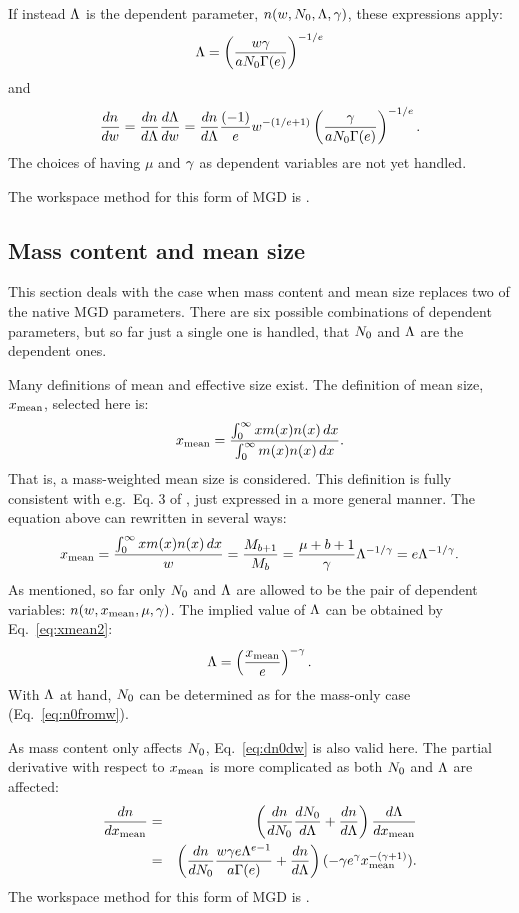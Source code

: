 If instead $\Lambda$ is the dependent parameter, $n(w,N_0,\Lambda,\gamma)$, these expressions apply:
\begin{equation}
  \Lambda = \left( \frac{w\gamma}{aN_0\Gamma(e)} \right)^{-1/e}
\end{equation}
and
\begin{equation}
  \frac{dn}{dw} = \frac{dn}{d\Lambda}\frac{d\Lambda}{dw} = \frac{dn}{d\Lambda} 
  \frac{(-1)}{e}w^{-(1/e+1)}\left( \frac{\gamma}{aN_0\Gamma(e)} \right)^{-1/e}.
\end{equation}
The choices of having $\mu$ and $\gamma$ as dependent variables are not yet
handled. 

The workspace method for this form of MGD is .



\subsection{Mass content and mean size}
%
This section deals with the case when mass content and mean size replaces two
of the native MGD parameters. There are six possible combinations of 
dependent parameters, but so far just a single one is handled, that $N_0$ and
$\Lambda$ are the dependent ones. 

Many definitions of mean and effective size exist. The definition of mean size,
$x_\mathrm{mean}$, selected here is:
\begin{equation}
  x_\mathrm{mean} =\frac{\int_0^\infty x m(x) n(x)\,dx}{\int_0^\infty m(x) n(x)\,dx}.
\end{equation}
That is, a mass-weighted mean size is considered. This definition is fully
consistent with e.g.\ Eq. 3 of \citet{delanoe2014normalized}, just expressed
in a more general manner. The equation above can rewritten in several ways:
\begin{equation}
  x_\mathrm{mean} =\frac{\int_0^\infty x m(x) n(x)\,dx}{w}=\frac{M_{b+1}}{M_b}=
  \frac{\mu+b+1}{\gamma}\Lambda^{-1/\gamma}=e\Lambda^{-1/\gamma}.
  \label{eq:xmean2}
\end{equation}
As mentioned, so far only $N_0$ and $\Lambda$ are allowed to be the pair of
dependent variables: $n(w,x_\mathrm{mean},\mu,\gamma)$. The implied value of $\Lambda$ can be
obtained by Eq.~\ref{eq:xmean2}:
\begin{equation}
  \Lambda = \left( \frac{x_\mathrm{mean}}{e}\right)^{-\gamma}.
\end{equation}
With $\Lambda$ at hand, $N_0$ can be determined as for the mass-only case
(Eq.~\ref{eq:n0fromw}).

As mass content only affects $N_0$, Eq.~\ref{eq:dn0dw} is also valid here. The
partial derivative with respect to $x_\mathrm{mean}$ is more complicated as both $N_0$
and $\Lambda$ are affected:
\begin{eqnarray}
  \frac{dn}{dx_\mathrm{mean}} &=& \left( \frac{dn}{dN_0}\frac{dN_0}{d\Lambda} + 
                        \frac{dn}{d\Lambda} \right) \frac{d\Lambda}{dx_\mathrm{mean}} \nonumber\\
 &=& \left( \frac{dn}{dN_0} \frac{w\gamma e\Lambda^{e-1}}{a\Gamma(e)} + 
                        \frac{dn}{d\Lambda} \right) (-\gamma e^\gamma x_\mathrm{mean}^{-(\gamma+1)}).
\end{eqnarray}
The workspace method for this form of MGD is .



